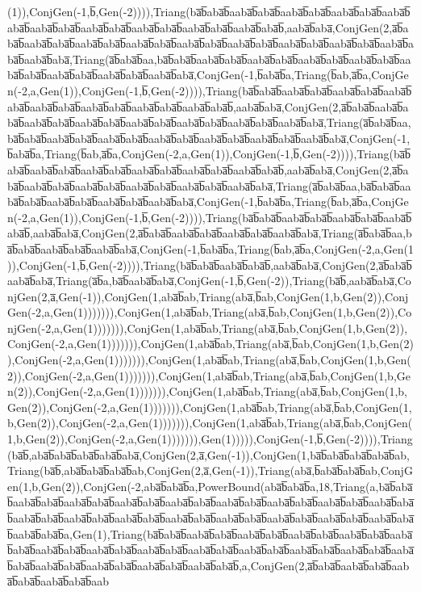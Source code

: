 (1)),ConjGen(-1,b̅,Gen(-2)))),Triang(ba̅b̅aba̅b̅aaba̅b̅aba̅b̅aaba̅b̅aba̅b̅aaba̅b̅aba̅b̅aaba̅b̅aba̅b̅aaba̅b̅aba̅b̅aaba̅b̅aba̅b̅aaba̅b̅aba̅b̅aaba̅b̅aba̅b̅aaba̅b̅aba̅b̅,aaba̅b̅aba̅,ConjGen(2,a̅b̅aba̅b̅aaba̅b̅aba̅b̅aaba̅b̅aba̅b̅aaba̅b̅aba̅b̅aaba̅b̅aba̅b̅aaba̅b̅aba̅b̅aaba̅b̅aba̅b̅aaba̅b̅aba̅b̅aaba̅b̅aba̅b̅aaba̅b̅aba̅,Triang(a̅b̅aba̅b̅aa,ba̅b̅aba̅b̅aaba̅b̅aba̅b̅aaba̅b̅aba̅b̅aaba̅b̅aba̅b̅aaba̅b̅aba̅b̅aaba̅b̅aba̅b̅aaba̅b̅aba̅b̅aaba̅b̅aba̅b̅aaba̅b̅aba̅,ConjGen(-1,b̅aba̅b̅a,Triang(b̅ab,a̅b̅a,ConjGen(-2,a,Gen(1)),ConjGen(-1,b̅,Gen(-2)))),Triang(ba̅b̅aba̅b̅aaba̅b̅aba̅b̅aaba̅b̅aba̅b̅aaba̅b̅aba̅b̅aaba̅b̅aba̅b̅aaba̅b̅aba̅b̅aaba̅b̅aba̅b̅aaba̅b̅aba̅b̅,aaba̅b̅aba̅,ConjGen(2,a̅b̅aba̅b̅aaba̅b̅aba̅b̅aaba̅b̅aba̅b̅aaba̅b̅aba̅b̅aaba̅b̅aba̅b̅aaba̅b̅aba̅b̅aaba̅b̅aba̅b̅aaba̅b̅aba̅,Triang(a̅b̅aba̅b̅aa,ba̅b̅aba̅b̅aaba̅b̅aba̅b̅aaba̅b̅aba̅b̅aaba̅b̅aba̅b̅aaba̅b̅aba̅b̅aaba̅b̅aba̅b̅aaba̅b̅aba̅,ConjGen(-1,b̅aba̅b̅a,Triang(b̅ab,a̅b̅a,ConjGen(-2,a,Gen(1)),ConjGen(-1,b̅,Gen(-2)))),Triang(ba̅b̅aba̅b̅aaba̅b̅aba̅b̅aaba̅b̅aba̅b̅aaba̅b̅aba̅b̅aaba̅b̅aba̅b̅aaba̅b̅aba̅b̅,aaba̅b̅aba̅,ConjGen(2,a̅b̅aba̅b̅aaba̅b̅aba̅b̅aaba̅b̅aba̅b̅aaba̅b̅aba̅b̅aaba̅b̅aba̅b̅aaba̅b̅aba̅,Triang(a̅b̅aba̅b̅aa,ba̅b̅aba̅b̅aaba̅b̅aba̅b̅aaba̅b̅aba̅b̅aaba̅b̅aba̅b̅aaba̅b̅aba̅,ConjGen(-1,b̅aba̅b̅a,Triang(b̅ab,a̅b̅a,ConjGen(-2,a,Gen(1)),ConjGen(-1,b̅,Gen(-2)))),Triang(ba̅b̅aba̅b̅aaba̅b̅aba̅b̅aaba̅b̅aba̅b̅aaba̅b̅aba̅b̅,aaba̅b̅aba̅,ConjGen(2,a̅b̅aba̅b̅aaba̅b̅aba̅b̅aaba̅b̅aba̅b̅aaba̅b̅aba̅,Triang(a̅b̅aba̅b̅aa,ba̅b̅aba̅b̅aaba̅b̅aba̅b̅aaba̅b̅aba̅,ConjGen(-1,b̅aba̅b̅a,Triang(b̅ab,a̅b̅a,ConjGen(-2,a,Gen(1)),ConjGen(-1,b̅,Gen(-2)))),Triang(ba̅b̅aba̅b̅aaba̅b̅aba̅b̅,aaba̅b̅aba̅,ConjGen(2,a̅b̅aba̅b̅aaba̅b̅aba̅,Triang(a̅b̅a,ba̅b̅aaba̅b̅aba̅,ConjGen(-1,b̅,Gen(-2)),Triang(ba̅b̅,aaba̅b̅aba̅,ConjGen(2,a̅,Gen(-1)),ConjGen(1,aba̅b̅ab,Triang(aba̅,b̅ab,ConjGen(1,b,Gen(2)),ConjGen(-2,a,Gen(1))))))),ConjGen(1,aba̅b̅ab,Triang(aba̅,b̅ab,ConjGen(1,b,Gen(2)),ConjGen(-2,a,Gen(1))))))),ConjGen(1,aba̅b̅ab,Triang(aba̅,b̅ab,ConjGen(1,b,Gen(2)),ConjGen(-2,a,Gen(1))))))),ConjGen(1,aba̅b̅ab,Triang(aba̅,b̅ab,ConjGen(1,b,Gen(2)),ConjGen(-2,a,Gen(1))))))),ConjGen(1,aba̅b̅ab,Triang(aba̅,b̅ab,ConjGen(1,b,Gen(2)),ConjGen(-2,a,Gen(1))))))),ConjGen(1,aba̅b̅ab,Triang(aba̅,b̅ab,ConjGen(1,b,Gen(2)),ConjGen(-2,a,Gen(1))))))),ConjGen(1,aba̅b̅ab,Triang(aba̅,b̅ab,ConjGen(1,b,Gen(2)),ConjGen(-2,a,Gen(1))))))),ConjGen(1,aba̅b̅ab,Triang(aba̅,b̅ab,ConjGen(1,b,Gen(2)),ConjGen(-2,a,Gen(1))))))),ConjGen(1,aba̅b̅ab,Triang(aba̅,b̅ab,ConjGen(1,b,Gen(2)),ConjGen(-2,a,Gen(1))))))),Gen(1))))),ConjGen(-1,b̅,Gen(-2)))),Triang(ba̅b̅,aba̅b̅aba̅b̅aba̅b̅aba̅b̅aba̅,ConjGen(2,a̅,Gen(-1)),ConjGen(1,ba̅b̅aba̅b̅aba̅b̅aba̅b̅ab,Triang(ba̅b̅,aba̅b̅aba̅b̅aba̅b̅ab,ConjGen(2,a̅,Gen(-1)),Triang(aba̅,b̅aba̅b̅aba̅b̅ab,ConjGen(1,b,Gen(2)),ConjGen(-2,aba̅b̅aba̅b̅a,PowerBound(aba̅b̅aba̅b̅a,18,Triang(a,ba̅b̅aba̅b̅aaba̅b̅aba̅b̅aaba̅b̅aba̅b̅aaba̅b̅aba̅b̅aaba̅b̅aba̅b̅aaba̅b̅aba̅b̅aaba̅b̅aba̅b̅aaba̅b̅aba̅b̅aaba̅b̅aba̅b̅aaba̅b̅aba̅b̅aaba̅b̅aba̅b̅aaba̅b̅aba̅b̅aaba̅b̅aba̅b̅aaba̅b̅aba̅b̅aaba̅b̅aba̅b̅aaba̅b̅aba̅b̅aaba̅b̅aba̅b̅aaba̅b̅aba̅b̅a,Gen(1),Triang(ba̅b̅aba̅b̅aaba̅b̅aba̅b̅aaba̅b̅aba̅b̅aaba̅b̅aba̅b̅aaba̅b̅aba̅b̅aaba̅b̅aba̅b̅aaba̅b̅aba̅b̅aaba̅b̅aba̅b̅aaba̅b̅aba̅b̅aaba̅b̅aba̅b̅aaba̅b̅aba̅b̅aaba̅b̅aba̅b̅aaba̅b̅aba̅b̅aaba̅b̅aba̅b̅aaba̅b̅aba̅b̅aaba̅b̅aba̅b̅aaba̅b̅aba̅b̅aaba̅b̅aba̅b̅,a,ConjGen(2,a̅b̅aba̅b̅aaba̅b̅aba̅b̅aaba̅b̅aba̅b̅aaba̅b̅aba̅b̅aab
